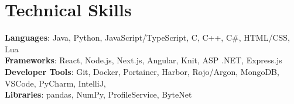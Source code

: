 \documentclass[letterpaper,11pt]{article}
\begin{document}
\section{Technical Skills}
 \begin{itemize}[leftmargin=0.15in, label={}]
    \small{\item{
     \textbf{Languages}{: Java, Python, JavaScript/TypeScript, C, C++, C\#, HTML/CSS, Lua} \\
     \textbf{Frameworks}{: React, Node.js, Next.js, Angular, Knit, ASP .NET, Express.js} \\
     \textbf{Developer Tools}{: Git, Docker, Portainer, Harbor, Rojo/Argon, MongoDB, VSCode, PyCharm, IntelliJ,} \\
     \textbf{Libraries}{: pandas, NumPy, ProfileService, ByteNet}
    }}
 \end{itemize}
%
\end{document}

